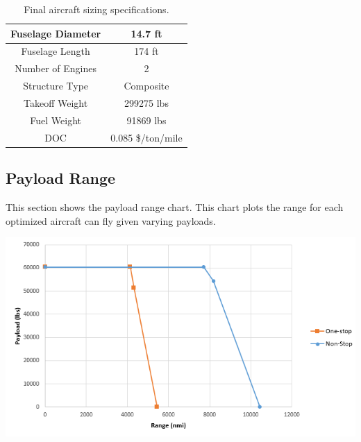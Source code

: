 \documentclass{article}
\begin{document}
\begin{table}[ht]
\begin{tabular}{|c|c|}
                \rowcolor[HTML]{C0C0C0}
                Fuselage Diameter                  & 14.7 ft                             \\ \hline
                \rowcolor[HTML]{FFFFFF}
                Fuselage Length                    & 174 ft                              \\ \hline
                \rowcolor[HTML]{C0C0C0}
                Number of Engines                  & 2                                   \\ \hline
                \rowcolor[HTML]{FFFFFF}
                Structure Type                     & Composite                           \\ \hline
                \rowcolor[HTML]{C0C0C0}
                Takeoff Weight                     & 299275 lbs                          \\ \hline
                \rowcolor[HTML]{FFFFFF}
                Fuel Weight                        & 91869 lbs                           \\ \hline
                \rowcolor[HTML]{C0C0C0}
                DOC                                & 0.085 \$/ton/mile                   \\ \hline
            \end{tabular}
        \caption{Final aircraft sizing specifications.}
        \end{table}



    \subsection{Payload Range}
    \label{sec:PR}
    \begin{flushleft}
        This section shows the payload range chart. This chart plots the range
        for each optimized aircraft can fly given varying payloads.
    \end{flushleft}

    \begin{center}
        \includegraphics[scale=0.8]{Payload Range.PNG}
        \label{fig:PR}
    \end{center}
\end{document}
